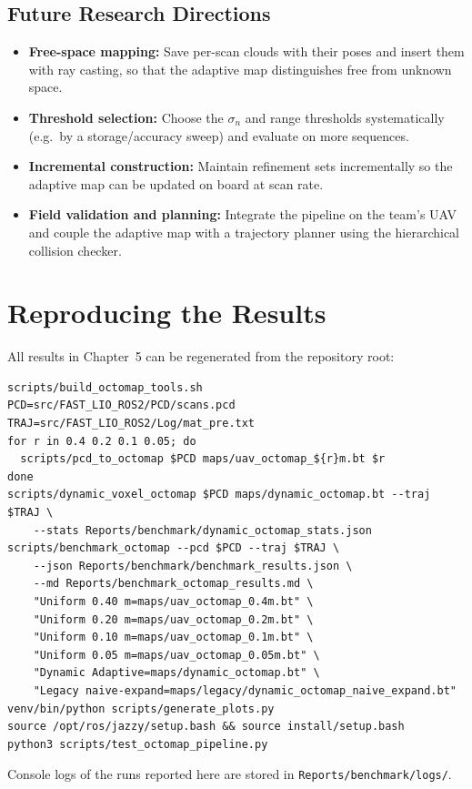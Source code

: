 \documentclass[11pt,a4paper]{report}
\begin{document}
\section{Future Research Directions}
\begin{itemize}
    \item \textbf{Free-space mapping:} Save per-scan clouds with their poses and insert them with ray casting, so that the adaptive map distinguishes free from unknown space.
    \item \textbf{Threshold selection:} Choose the $\sigma_n$ and range thresholds systematically (e.g.\ by a storage/accuracy sweep) and evaluate on more sequences.
    \item \textbf{Incremental construction:} Maintain refinement sets incrementally so the adaptive map can be updated on board at scan rate.
    \item \textbf{Field validation and planning:} Integrate the pipeline on the team's UAV and couple the adaptive map with a trajectory planner using the hierarchical collision checker.
\end{itemize}

\newpage

\appendix
\chapter{Reproducing the Results}
All results in Chapter~5 can be regenerated from the repository root:
{\small
\begin{verbatim}
scripts/build_octomap_tools.sh
PCD=src/FAST_LIO_ROS2/PCD/scans.pcd
TRAJ=src/FAST_LIO_ROS2/Log/mat_pre.txt
for r in 0.4 0.2 0.1 0.05; do
  scripts/pcd_to_octomap $PCD maps/uav_octomap_${r}m.bt $r
done
scripts/dynamic_voxel_octomap $PCD maps/dynamic_octomap.bt --traj $TRAJ \
    --stats Reports/benchmark/dynamic_octomap_stats.json
scripts/benchmark_octomap --pcd $PCD --traj $TRAJ \
    --json Reports/benchmark/benchmark_results.json \
    --md Reports/benchmark_octomap_results.md \
    "Uniform 0.40 m=maps/uav_octomap_0.4m.bt" \
    "Uniform 0.20 m=maps/uav_octomap_0.2m.bt" \
    "Uniform 0.10 m=maps/uav_octomap_0.1m.bt" \
    "Uniform 0.05 m=maps/uav_octomap_0.05m.bt" \
    "Dynamic Adaptive=maps/dynamic_octomap.bt" \
    "Legacy naive-expand=maps/legacy/dynamic_octomap_naive_expand.bt"
venv/bin/python scripts/generate_plots.py
source /opt/ros/jazzy/setup.bash && source install/setup.bash
python3 scripts/test_octomap_pipeline.py
\end{verbatim}
}
Console logs of the runs reported here are stored in \texttt{Reports/benchmark/logs/}.
\end{document}
